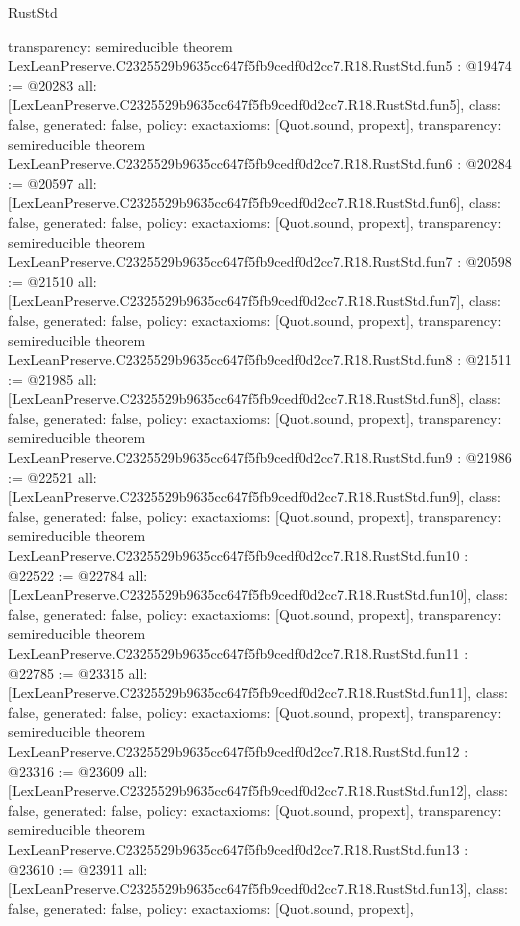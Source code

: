 \begin{lexlean}{RustStd}
\begin{coremodule}
{  transparency: semireducible
}
theorem LexLeanPreserve.C2325529b9635cc647f5fb9cedf0d2cc7.R18.RustStd.fun5 : @19474 := @20283 {
  all: [LexLeanPreserve.C2325529b9635cc647f5fb9cedf0d2cc7.R18.RustStd.fun5],
  class: false,
  generated: false,
  policy: exact{axioms: [Quot.sound, propext]},
  transparency: semireducible
}
theorem LexLeanPreserve.C2325529b9635cc647f5fb9cedf0d2cc7.R18.RustStd.fun6 : @20284 := @20597 {
  all: [LexLeanPreserve.C2325529b9635cc647f5fb9cedf0d2cc7.R18.RustStd.fun6],
  class: false,
  generated: false,
  policy: exact{axioms: [Quot.sound, propext]},
  transparency: semireducible
}
theorem LexLeanPreserve.C2325529b9635cc647f5fb9cedf0d2cc7.R18.RustStd.fun7 : @20598 := @21510 {
  all: [LexLeanPreserve.C2325529b9635cc647f5fb9cedf0d2cc7.R18.RustStd.fun7],
  class: false,
  generated: false,
  policy: exact{axioms: [Quot.sound, propext]},
  transparency: semireducible
}
theorem LexLeanPreserve.C2325529b9635cc647f5fb9cedf0d2cc7.R18.RustStd.fun8 : @21511 := @21985 {
  all: [LexLeanPreserve.C2325529b9635cc647f5fb9cedf0d2cc7.R18.RustStd.fun8],
  class: false,
  generated: false,
  policy: exact{axioms: [Quot.sound, propext]},
  transparency: semireducible
}
theorem LexLeanPreserve.C2325529b9635cc647f5fb9cedf0d2cc7.R18.RustStd.fun9 : @21986 := @22521 {
  all: [LexLeanPreserve.C2325529b9635cc647f5fb9cedf0d2cc7.R18.RustStd.fun9],
  class: false,
  generated: false,
  policy: exact{axioms: [Quot.sound, propext]},
  transparency: semireducible
}
theorem LexLeanPreserve.C2325529b9635cc647f5fb9cedf0d2cc7.R18.RustStd.fun10 : @22522 := @22784 {
  all: [LexLeanPreserve.C2325529b9635cc647f5fb9cedf0d2cc7.R18.RustStd.fun10],
  class: false,
  generated: false,
  policy: exact{axioms: [Quot.sound, propext]},
  transparency: semireducible
}
theorem LexLeanPreserve.C2325529b9635cc647f5fb9cedf0d2cc7.R18.RustStd.fun11 : @22785 := @23315 {
  all: [LexLeanPreserve.C2325529b9635cc647f5fb9cedf0d2cc7.R18.RustStd.fun11],
  class: false,
  generated: false,
  policy: exact{axioms: [Quot.sound, propext]},
  transparency: semireducible
}
theorem LexLeanPreserve.C2325529b9635cc647f5fb9cedf0d2cc7.R18.RustStd.fun12 : @23316 := @23609 {
  all: [LexLeanPreserve.C2325529b9635cc647f5fb9cedf0d2cc7.R18.RustStd.fun12],
  class: false,
  generated: false,
  policy: exact{axioms: [Quot.sound, propext]},
  transparency: semireducible
}
theorem LexLeanPreserve.C2325529b9635cc647f5fb9cedf0d2cc7.R18.RustStd.fun13 : @23610 := @23911 {
  all: [LexLeanPreserve.C2325529b9635cc647f5fb9cedf0d2cc7.R18.RustStd.fun13],
  class: false,
  generated: false,
  policy: exact{axioms: [Quot.sound, propext]},
}
\end{coremodule}
\end{lexlean}
